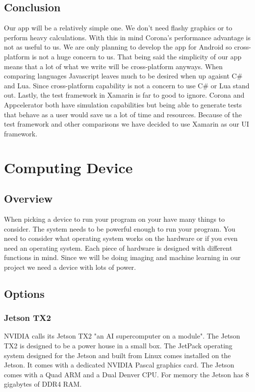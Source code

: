 \documentclass[onecolumn, draftclsnofoot,10pt, compsoc]{IEEEtran}
\begin{document}
	\subsection{Conclusion}
		Our app will be a relatively simple one.
		We don't need flashy graphics or to perform heavy calculations.
		With this in mind Corona's performance advantage is not as useful to us.
		We are only planning to develop the app for Android so cross-platform is not a huge concern to us.
		That being said the simplicity of our app means that a lot of what we write will be cross-platform anyways.
		When comparing languages Javascript leaves much to be desired when up agaisnt C\# and Lua.
		Since cross-platform capability is not a concern to use C\# or Lua stand out.
		Lastly, the test framework in Xamarin is far to good to ignore.
		Corona and Appcelerator both have simulation capabilities but being able to generate tests that behave as a user would save us a lot of time and resources.
		Because of the test framework and other comparisons we have decided to use Xamarin as our UI framework.

\section{Computing Device}
	\subsection{Overview}
		When picking a device to run your program on your have many things to consider.
		The system needs to be powerful enough to run your program.
		You need to consider what operating system works on the hardware or if you even need an operating system.
		Each piece of hardware is designed with different functions in mind.
		Since we will be doing imaging and machine learning in our project we need a device with lots of power.

	\subsection{Options}
		\subsubsection{Jetson TX2}
			NVIDIA calls its Jetson TX2 "an AI supercomputer on a module".
			The Jetson TX2 is designed to be a power house in a small box.
			The JetPack operating system designed for the Jetson and built from Linux comes installed on the Jetson\cite{jetson_dev_kit_guide}.
			It comes with a dedicated NVIDIA Pascal graphics card.
			The Jetson comes with a Quad ARM and a Dual Denver CPU.
			For memory the Jetson has 8 gigabytes of DDR4 RAM\cite{jetson_dev_kit}.
\end{document}

